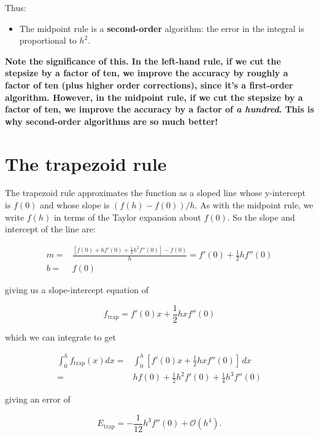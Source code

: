 \documentclass[12ampt]{article}
\begin{document}
Thus:

\begin{itemize}
      \item{The midpoint rule is a {\bf second-order} algorithm: the error in the integral is proportional to $h^2$.}
 \end{itemize}



{\bf Note the significance of this. In the left-hand rule, if we cut the stepsize by a factor of ten, we improve the accuracy by roughly a factor of ten (plus higher order corrections), since it's a first-order algorithm.
However, in the midpoint rule, if we cut the stepsize by a factor of ten, we improve the accuracy by a factor of {\it a hundred}. This is why second-order algorithms are so much better!}


\section{The trapezoid rule}

The trapezoid rule approximates the function as a sloped line whose y-intercept is $f(0)$ and whose slope is $(f(h) - f(0))/h$. As with the midpoint rule, we write $f(h)$ in terms of the Taylor expansion
about $f(0)$. So the slope and intercept of the line are:

\begin{align}
  m =& \frac{\left[ f(0) + hf'(0) + \frac{1}{2} h^2 f''(0) \right] - f(0)}{h} = f'(0) + \frac{1}{2}hf''(0) \\
  b =& f(0)
\end{align}

giving us a slope-intercept equation of

\begin{equation}
  f_{\mathrm{trap}} = f'(0)x + \frac{1}{2}hxf''(0) 
\end{equation}

which we can integrate to get 

\begin{align}
  \int_0^h f_{\mathrm{trap}}(x) dx =& \int_0^h \left[f'(0)x + \frac{1}{2}hxf''(0)\right] \, dx \\
     =& hf(0) + \frac{1}{2}h^2 f'(0) + \frac{1}{4} h^3 f''(0)
\end{align}

giving an error of

\begin{equation}
    E_{\mathrm{trap}}=-\frac{1}{12} h^3 f''(0) + \mathcal O(h^4).
\end{equation}
\end{document}
